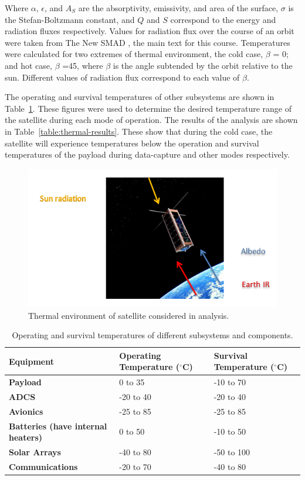 \documentclass[12pt]{article}
\begin{document}
Where $\alpha$, $\epsilon$, and $A_S$ are the absorptivity, emissivity, and area of the surface, $\sigma$ is the Stefan-Boltzmann constant, and $Q$ and $S$ correspond to the energy and radiation fluxes respectively. Values for radiation flux over the course of an orbit were taken from The New SMAD \cite[p.~688,~table~22-11]{SMAD}, the main text for this course. Temperatures were calculated for two extremes of thermal environment, the cold case, $\beta$ = 0; and hot case, $\beta$ =45, where $\beta$ is the angle subtended by the orbit relative to the sun.  Different values of radiation flux correspond to each value of $\beta$.

The operating and survival temperatures of other subsystems are shown in Table~\ref{table:thermal-inputs}. These figures were used to determine the desired temperature range of the satellite during each mode of operation. The results of the analysis are shown in Table~\ref{table:thermal-results}. These show that during the cold case, the satellite will experience temperatures below the operation and survival temperatures of the payload during data-capture and other modes respectively.

\begin{figure}[ht]%
\centering
\includegraphics{images/thermal-environment}%
\caption{Thermal environment of satellite considered in analysis.\cite{satnews}}%
\label{fig:thermal-environment}%
\end{figure}

\begin{table}[ht]%
\caption{Operating and survival temperatures of different subsystems and components.}
\label{table:thermal-inputs}
\begin{tabular}{|p{1.5in}|l|l|}\hline
\textbf{Equipment} & \textbf{Operating Temperature ($^\circ$C)} & \textbf{Survival Temperature ($^\circ$C)} \\\hline
\textbf{Payload} & 0 to 35 & -10 to 70 \\\hline
\textbf{ADCS} & -20 to 40 & -20 to 40 \\\hline
\textbf{Avionics} & -25 to 85 & -25 to 85\\\hline
\textbf{Batteries (have internal heaters)} & 0 to 50 & -10 to 50\\\hline
\textbf{Solar Arrays} & -40 to 80  & -50 to 100 \\\hline
\textbf{Communications} & -20 to 70 & -40 to 80 \\\hline
\end{tabular}
\end{table}
\end{document}
